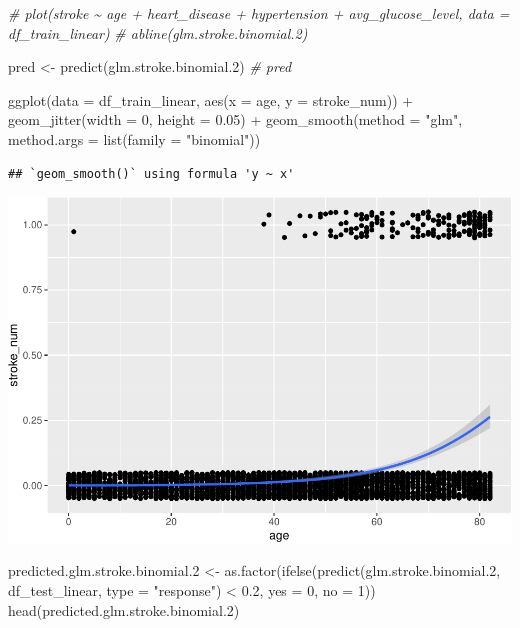 \documentclass[
]{article}
\newenvironment{Shaded}{\begin{snugshade}}{\end{snugshade}}
\newcommand{\AttributeTok}[1]{\textcolor[rgb]{0.77,0.63,0.00}{#1}}
\newcommand{\CommentTok}[1]{\textcolor[rgb]{0.56,0.35,0.01}{\textit{#1}}}
\newcommand{\DecValTok}[1]{\textcolor[rgb]{0.00,0.00,0.81}{#1}}
\newcommand{\FloatTok}[1]{\textcolor[rgb]{0.00,0.00,0.81}{#1}}
\newcommand{\FunctionTok}[1]{\textcolor[rgb]{0.00,0.00,0.00}{#1}}
\newcommand{\NormalTok}[1]{#1}
\newcommand{\OtherTok}[1]{\textcolor[rgb]{0.56,0.35,0.01}{#1}}
\newcommand{\SpecialCharTok}[1]{\textcolor[rgb]{0.00,0.00,0.00}{#1}}
\newcommand{\StringTok}[1]{\textcolor[rgb]{0.31,0.60,0.02}{#1}}
\renewcommand{\=}[1]{\stackrel{#1}{=}}
\theoremstyle{definition}
\theoremstyle{remark}
\begin{document}
\begin{Shaded}
\begin{Highlighting}[]
\CommentTok{\# plot(stroke \textasciitilde{} age + heart\_disease + hypertension + avg\_glucose\_level, data = df\_train\_linear)}
\CommentTok{\# abline(glm.stroke.binomial.2)}

\NormalTok{pred }\OtherTok{\textless{}{-}} \FunctionTok{predict}\NormalTok{(glm.stroke.binomial}\FloatTok{.2}\NormalTok{)}
\CommentTok{\# pred}

\FunctionTok{ggplot}\NormalTok{(}\AttributeTok{data =}\NormalTok{ df\_train\_linear, }\FunctionTok{aes}\NormalTok{(}\AttributeTok{x =}\NormalTok{ age, }\AttributeTok{y =}\NormalTok{ stroke\_num)) }\SpecialCharTok{+} 
  \FunctionTok{geom\_jitter}\NormalTok{(}\AttributeTok{width =} \DecValTok{0}\NormalTok{, }\AttributeTok{height =} \FloatTok{0.05}\NormalTok{) }\SpecialCharTok{+}
  \FunctionTok{geom\_smooth}\NormalTok{(}\AttributeTok{method =} \StringTok{"glm"}\NormalTok{, }\AttributeTok{method.args =} \FunctionTok{list}\NormalTok{(}\AttributeTok{family =} \StringTok{"binomial"}\NormalTok{))}
\end{Highlighting}
\end{Shaded}

\begin{verbatim}
## `geom_smooth()` using formula 'y ~ x'
\end{verbatim}

\includegraphics{sioux_mach_learn_project_files/figure-latex/unnamed-chunk-40-1.pdf}

\begin{Shaded}
\begin{Highlighting}[]
\NormalTok{predicted.glm.stroke.binomial}\FloatTok{.2} \OtherTok{\textless{}{-}} \FunctionTok{as.factor}\NormalTok{(}\FunctionTok{ifelse}\NormalTok{(}\FunctionTok{predict}\NormalTok{(glm.stroke.binomial}\FloatTok{.2}\NormalTok{, df\_test\_linear, }\AttributeTok{type =} \StringTok{"response"}\NormalTok{) }\SpecialCharTok{\textless{}} \FloatTok{0.2}\NormalTok{, }\AttributeTok{yes =} \DecValTok{0}\NormalTok{, }\AttributeTok{no =} \DecValTok{1}\NormalTok{))}
\FunctionTok{head}\NormalTok{(predicted.glm.stroke.binomial}\FloatTok{.2}\NormalTok{)}
\end{Highlighting}
\end{Shaded}
\end{document}
